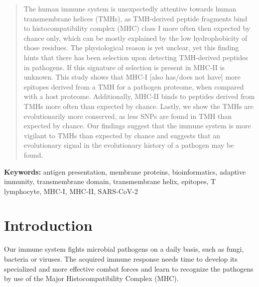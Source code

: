 \begin{abstract}

The human immune system is unexpectedly attentive towards
human transmembrane helices (TMHs), as TMH-derived peptide fragments
bind to histocompatibility complex (MHC) class I more often then expected
by chance only, which can be mostly explained by the low hydrophobicity
of those residues.
The physiological reason is yet unclear,
yet this finding hints that there has been selection upon detecting TMH-derived
peptides in pathogens.
If this signature of selection is present in MHC-II is unknown.
This study shows that MHC-I [also has/does not have] more
epitopes derived from a TMH for a pathogen proteome, when compared with
a host proteome.
Additionally, MHC-II binds to peptides derived from TMHs 
more often than expected by chance.
Lastly, we show the TMHs are evolutionarily more conserved,
as less SNPs are found in TMH than expected by chance.
Our findings suggest that the immune system is more
vigilant to TMHs than expected by chance
and suggests that an evolutionary signal in the evolutionary history of a pathogen
may be found.

\end{abstract}

{\bf Keywords:} antigen presentation, membrane proteins, bioinformatics, 
adaptive immunity, transmembrane domain, transmembrane helix, 
epitopes, T lymphocyte, MHC-I, MHC-II, SARS-CoV-2

\section{Introduction}


Our immune system fights microbial pathogens on a daily basis,
such as fungi, bacteria or viruses.
The acquired immune response
needs time to develop its specialized and more effective
combat forces and learn to recognize the pathogens 
by use of the Major Histocompatibility Complex (MHC).


